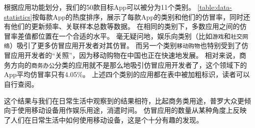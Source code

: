 根据应用功能划分，我们的50款目标App可以被分为11个类别。
\autoref{table:data-statistics}按每款App的热度排序，展示了每款App的类别和他们的仿冒率，同时还有他们的更新频率、关联样本总数等数据。
在相同的类别下，多数应用之间的仿冒率差值都位置在一个合适的水平。
毫无疑问地，娱乐向类别（比如\texttt{游戏}和\texttt{社交网络}）吸引了更多仿冒应用开发者对其仿冒。
而另一个类别\texttt{移动购物}也特别受到了仿冒应用开发者的``关照''，因为移动购物在中国也正在快速地发展。
相对来说，商务方向的\texttt{商务办公}分类的应用就不是那么地吸引仿冒应用开发者了，这个领域下的App平均仿冒率只有4.05\%。
上述四个类别的应用都在表中被加粗标识，读者可以自行查阅。

这个结果与我们在日常生活中观察到的结果相符，比起商务类用途，普罗大众更倾向于使用移动设备用作娱乐用途，消遣时间。
仿冒应用的数量从某种角度上反映了人们在日常生活中如何使用移动设备，这是个十分有趣的发现。

\vspace{5mm}
\noindent{}

